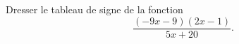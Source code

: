 
\begin{exercice}\label{exosmath-0225}

Dresser le tableau de signe de la fonction
\begin{equation}
    \frac{ (-9x-9)(2x-1) }{ 5x+20 }.
\end{equation}

\end{exercice}
